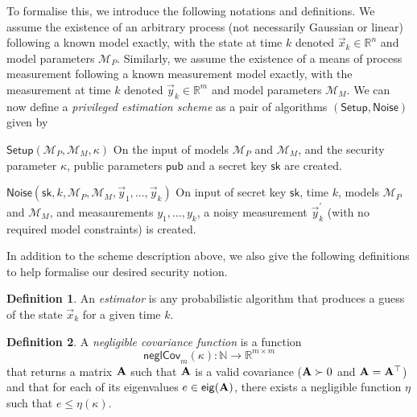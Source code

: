 \documentclass[letterpaper, 10 pt, conference]{IEEEtran}
\theoremstyle{definition}
\newtheorem{definition}{Definition}[section]
\begin{document}
To formalise this, we introduce the following notations and definitions. We assume the existence of an arbitrary process (not necessarily Gaussian or linear) following a known model exactly, with the state at time $k$ denoted $\vec{x}_k\in\mathbb{R}^n$ and model parameters $\mathcal{M}_P$. Similarly, we assume the existence of a means of process measurement following a known measurement model exactly, with the measurement at time $k$ denoted $\vec{y}_k\in\mathbb{R}^m$ and model parameters $\mathcal{M}_M$. We can now define a \textit{privileged estimation scheme} as a pair of algorithms $(\mathsf{Setup},\mathsf{Noise})$ given by
\begin{LaTeXdescription}
   \item[$\mathsf{Setup}(\mathcal{M}_P, \mathcal{M}_M, \kappa)$] On the input of models $\mathcal{M}_P$ and $\mathcal{M}_M$, and the security parameter $\kappa$, public parameters $\mathsf{pub}$ and a secret key $\mathsf{sk}$ are created.
   \item[$\mathsf{Noise}(\mathsf{sk}, k, \mathcal{M}_P, \mathcal{M}_M, \vec{y}_1, \dots, \vec{y}_k)$] On input of secret key $\mathsf{sk}$, time $k$, models $\mathcal{M}_P$ and $\mathcal{M}_M$, and measaurements $y_1,\dots,y_k$, a noisy measurement $\vec{y}^\prime_k$ (with no required model constraints) is created.
\end{LaTeXdescription}
In addition to the scheme description above, we also give the following definitions to help formalise our desired security notion.
\begin{definition}\label{def:estimator}
   An \textit{estimator} is any probabilistic algorithm that produces a guess of the state $\vec{x}_k$ for a given time $k$.
\end{definition}
\begin{definition}
   A \textit{negligible covariance function} is a function 
   \begin{equation}
      \mathsf{neglCov}_m(\kappa):\mathbb{N}\rightarrow \mathbb{R}^{m\times m}
   \end{equation}
   that returns a matrix ${{\mathbf{A}}}$ such that ${{\mathbf{A}}}$ is a valid covariance (${{\mathbf{A}}}\succ 0$ and ${{\mathbf{A}}}={{\mathbf{A}}}^\top$) and that for each of its eigenvalues $e\in\mathsf{eig}({{\mathbf{A}}})$, there exists a negligible function $\eta$ such that $e\leq\eta(\kappa)$.
\end{definition}
\end{document}
